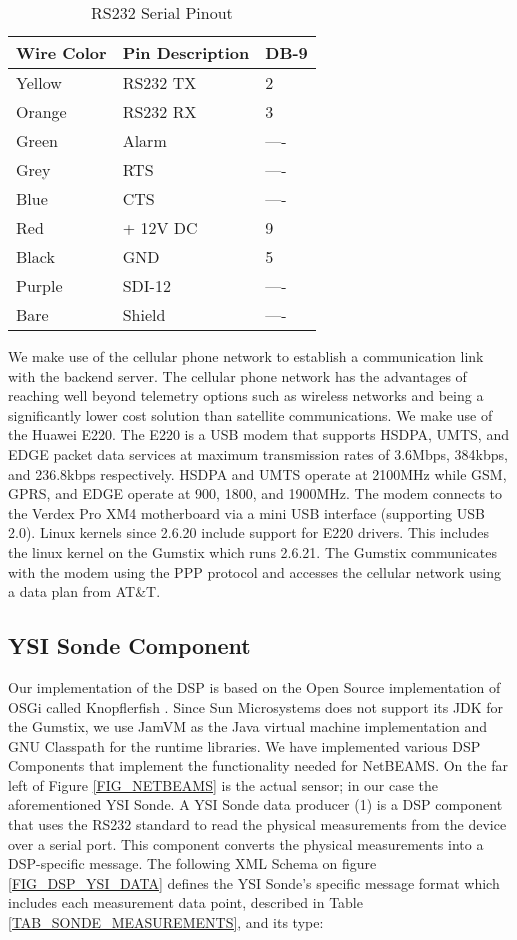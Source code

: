 \documentclass[conference]{IEEEtran}
\begin{document}
\begin{table}
\caption{\label{TAB_RS232_Pinout}RS232 Serial Pinout}
\centering
\begin{tabular} {|l|l|l|}
\hline
Wire Color	&Pin Description        &DB-9\\ 
\hline
Yellow 		&RS232 TX    &2\\
Orange		&RS232 RX    &3\\  
Green  		&Alarm       &----\\ 
Grey			&RTS         &----\\
Blue  		&CTS         &----\\
Red			&+ 12V DC    &9\\
Black			&GND         &5\\  
Purple		&SDI-12      &----\\ 
Bare			&Shield      &----\\
\hline
\end{tabular}
\end{table}
 

We make use of the cellular phone network to establish a communication
link with the backend server. The cellular phone network has the
advantages of reaching well beyond telemetry options such as wireless
networks and being a significantly lower cost solution than satellite
communications. We make use of the Huawei E220. The E220 is a USB
modem that supports HSDPA, UMTS, and EDGE packet data services at maximum
transmission rates of 3.6Mbps, 384kbps, and 236.8kbps respectively.
HSDPA and UMTS operate at 2100MHz while GSM, GPRS, and EDGE operate at
900, 1800, and 1900MHz. The modem connects to the Verdex Pro XM4
motherboard via a mini USB interface (supporting USB 2.0). Linux
kernels since 2.6.20 include support for E220 drivers.  This includes
the linux kernel on the Gumstix which runs 2.6.21.  The Gumstix
communicates with the modem using the PPP protocol and accesses the
cellular network using a data plan from AT\&T.



\subsection{YSI Sonde Component}

Our implementation of the DSP is based on the Open Source
implementation of OSGi called Knopflerfish \cite{knopflerfish01}.
Since Sun Microsystems does not support its JDK for the Gumstix, we
use JamVM \cite{jamvm01} as the Java virtual machine implementation
and GNU Classpath \cite{classpath01} for the runtime libraries. We
have implemented various DSP Components that implement the
functionality needed for NetBEAMS. On the far left of Figure
\ref{FIG_NETBEAMS} is the actual sensor; in our case the
aforementioned YSI Sonde. A YSI Sonde data producer (1) is a DSP
component that uses the RS232 standard to read the physical
measurements from the device over a serial port. This component
converts the physical measurements into a DSP-specific message. The
following XML Schema on figure \ref{FIG_DSP_YSI_DATA} defines the YSI
Sonde's specific message format which includes each measurement data
point, described in Table \ref{TAB_SONDE_MEASUREMENTS}, and its type:
\end{document}
